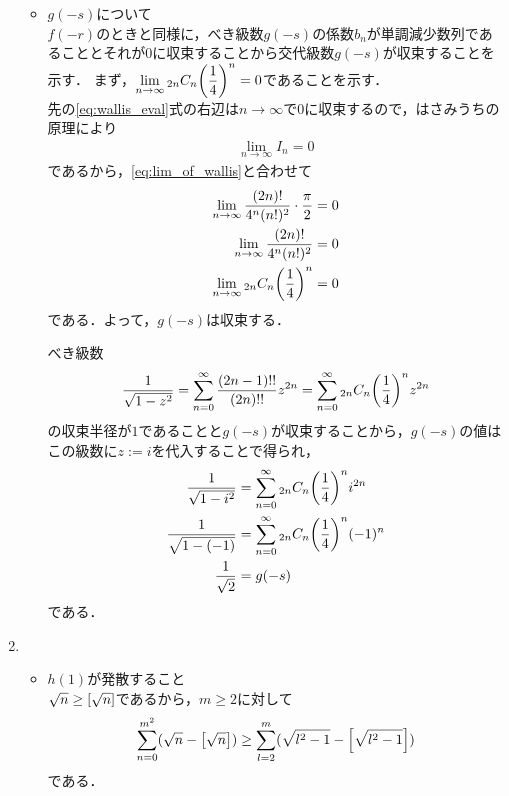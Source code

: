\begin{enumerate}[(1)]
\begin{itemize}
        \item $g(-s)$について\\
        $f(-r)$のときと同様に，べき級数$g(-s)$の係数$b_n$が単調減少数列であることとそれが$0$に収束することから交代級数$g(-s)$が収束することを示す．
        まず，$\displaystyle\lim_{n\to\infty}{}_{2n}C_n\displaystyle\qty(\frac{1}{4})^n=0$であることを示す．\\
        先の\eqref{eq:wallis_eval}式の右辺は$n\to\infty$で$0$に収束するので，はさみうちの原理により
        \begin{align}
            \lim_{n\to\infty}I_{n}=0\label{eq:lim_of_wallis}
        \end{align}
        であるから，\eqref{eq:lim_of_wallis}と合わせて
        \begin{align}
            \lim_{n\to\infty}\frac{(2n)!}{4^n(n!)^2}\cdot \frac{\pi}{2}&=0\\
            \lim_{n\to\infty}\frac{(2n)!}{4^n(n!)^2}&=0\\
            \lim_{n\to\infty}{}_{2n}C_n\qty(\frac{1}{4})^n&=0
        \end{align}
        である．よって，$g(-s)$は収束する．
        
        べき級数
        \begin{equation}
            \frac{1}{\sqrt{{1-z^2}}}=\sum_{n=0}^{\infty}\frac{(2n-1)!!}{(2n)!!}z^{2n}=\sum_{n=0}^{\infty}{}_{2n}C_n\qty(\frac{1}{4})^n z^{2n}
        \end{equation}
        の収束半径が$1$であることと$g(-s)$が収束することから，$g(-s)$の値はこの級数に$z:=i$を代入することで得られ，
        \begin{align}
            \frac{1}{\sqrt{{1-i^2}}}
            &=\sum_{n=0}^{\infty}{}_{2n}C_n\qty(\frac{1}{4})^n i^{2n}\\
            \frac{1}{\sqrt{{1-(-1)}}}
            &=\sum_{n=0}^{\infty}{}_{2n}C_n\qty(\frac{1}{4})^n (-1)^{n}\\
            \frac{1}{\sqrt{2}}
            &=g(-s)
        \end{align}
        である．
    \end{itemize}
    \item 
    \begin{itemize}
        \item $h(1)$が発散すること\\
        $\sqrt{n}\ge\qty[\sqrt{n}]$であるから，$m\ge 2$に対して
        \begin{equation}
            \sum_{n=0}^{m^2}(\sqrt{n}-\qty[\sqrt{n}])
            \ge
            \sum_{l=2}^{m}(\sqrt{l^2-1}-\qty[\sqrt{l^2-1}])
        \end{equation}
        である．


\end{itemize}
\end{enumerate}
